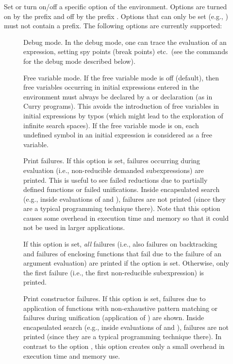 \begin{description}
\item[]
Set or turn on/off a specific option
of the \CYS environment. Options are turned on by the prefix
\ccode{+} and off by the prefix \ccode{-}. Options that can only
be set (e.g., ) must not contain a prefix.
The following options are currently supported:

\begin{description}
\item[] Debug mode.
In the debug mode, one can trace the evaluation of an expression,
setting spy points (break points) etc.\ (see the commands
for the debug mode described below).

\item[] Free variable mode.
If the free variable mode is off (default), then
free variables occurring in initial expressions entered in the
\CYS environment must always be declared by a 
or  declaration (as in Curry programs).
This avoids the introduction of free variables in initial expressions
by typos (which might lead to the exploration of infinite search spaces).
If the free variable mode is on, each undefined symbol
in an initial expression is considered as a free variable.

\item[] Print failures.
If this option is set, failures occurring during evaluation
(i.e., non-reducible demanded subexpressions) are printed.
This is useful to see failed reductions due to partially
defined functions or failed unifications.
Inside encapsulated search (e.g., inside evaluations of
 and ), failures are not printed
(since they are a typical programming technique there).
Note that this option causes some overhead in execution time
and memory so that it could not be used in larger applications.

\item[]
If this option is set, \emph{all} failures
(i.e., also failures on backtracking and failures
of enclosing functions that fail due to the failure of an argument
evaluation) are printed if the option  is set.
Otherwise, only the first failure (i.e., the first non-reducible
subexpression) is printed.

\item[] Print constructor failures.
If this option is set, failures due to application of
functions with non-exhaustive pattern matching or failures
during unification (application of \ccode{=:=}) are shown.
Inside encapsulated search (e.g., inside evaluations of
 and ), failures are not printed
(since they are a typical programming technique there).
In contrast to the option ,
this option creates only a small overhead in execution time
and memory use.


\end{description}
\end{description}
